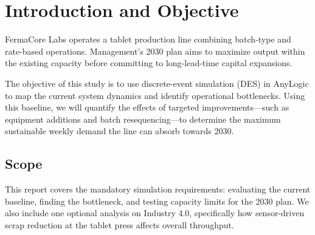 \section{Introduction and Objective}
\label{sec:intro}

FermaCore Labs operates a tablet production line combining batch-type and rate-based operations. Management's 2030 plan aims to maximize output within the existing capacity before committing to long-lead-time capital expansions. 

The objective of this study is to use discrete-event simulation (DES) in AnyLogic to map the current system dynamics and identify operational bottlenecks. Using this baseline, we will quantify the effects of targeted improvements—such as equipment additions and batch resequencing—to determine the maximum sustainable weekly demand the line can absorb towards 2030.

\subsection*{Scope}
This report covers the mandatory simulation requirements: evaluating the current baseline, finding the bottleneck, and testing capacity limits for the 2030 plan. We also include one optional analysis on Industry 4.0, specifically how sensor-driven scrap reduction at the tablet press affects overall throughput.